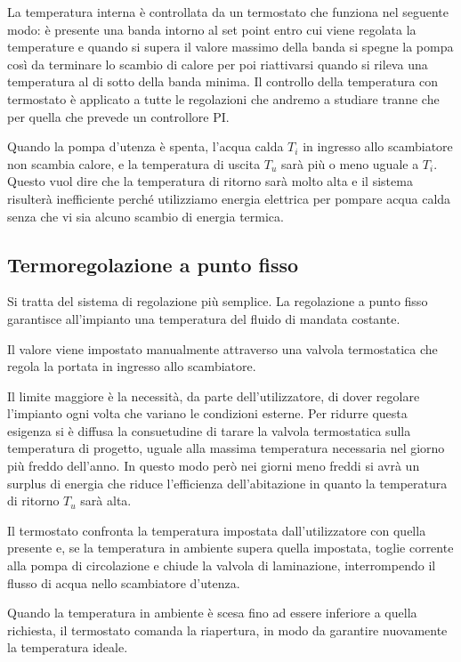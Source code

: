 \documentclass[laurea,oneside,11pt]{USiena_tesiLM3}
\begin{document}
La temperatura interna è controllata da un termostato che funziona nel seguente modo: è presente una banda intorno al set point entro cui viene regolata la temperature e quando si supera il valore massimo della banda si spegne la pompa così da terminare lo scambio di calore per poi riattivarsi quando si rileva una temperatura al di sotto della banda minima. Il controllo della temperatura con termostato è applicato a tutte le regolazioni che andremo a studiare tranne che per quella che prevede un controllore PI. 

Quando la pompa d'utenza è spenta, l'acqua calda $T_i$ in ingresso allo scambiatore non scambia calore, e la temperatura di uscita $T_u$ sarà più o meno uguale a $T_i$. Questo vuol dire che la temperatura di ritorno sarà molto alta e il sistema risulterà inefficiente perché utilizziamo energia elettrica per pompare acqua calda senza che vi sia alcuno scambio di energia termica.


\subsection{Termoregolazione a punto fisso}
Si tratta del sistema di regolazione più semplice. La regolazione a punto fisso garantisce all'impianto una temperatura del fluido di mandata costante. 

Il valore viene impostato manualmente attraverso una valvola termostatica che regola la portata in ingresso allo scambiatore.  

Il limite maggiore è la necessità, da parte dell'utilizzatore, di dover regolare l'impianto ogni volta che variano le condizioni esterne. Per ridurre questa esigenza si è diffusa la consuetudine di tarare la valvola termostatica sulla temperatura di progetto, uguale alla massima temperatura necessaria nel giorno più freddo dell'anno. In questo modo però nei giorni meno freddi si avrà un surplus di energia che riduce l'efficienza dell'abitazione in quanto la temperatura di ritorno $T_u$ sarà alta.

Il termostato confronta la temperatura impostata dall'utilizzatore con quella presente e, se la temperatura in ambiente supera quella impostata, toglie corrente alla pompa di circolazione e chiude la valvola di laminazione, interrompendo il flusso di acqua nello scambiatore d'utenza. 

Quando la temperatura in ambiente è scesa fino ad essere inferiore a quella richiesta, il termostato comanda la riapertura, in modo da garantire nuovamente la temperatura ideale.
\end{document}
